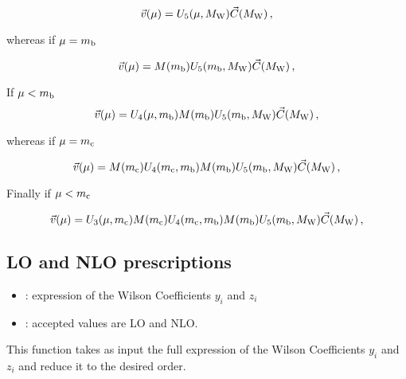 \begin{equation}
\vec{v}(\mu) =
U_5(\mu,M_{\mathrm W}) \vec{C}(M_{\mathrm W}) \, ,
\label{eq:WCv}
\end{equation}

whereas if $\mu=m_{\mathrm b}$

\begin{equation}
\vec{v}(\mu) =
M(m_{\mathrm b}) U_5(m_{\mathrm b},M_{\mathrm W}) \vec{C}(M_{\mathrm W}) \, ,
\label{eq:WCv}
\end{equation}

If $\mu<m_{\mathrm b}$
\begin{equation}
\vec{v}(\mu) =
U_4(\mu,m_{\mathrm b}) M(m_{\mathrm b}) U_5(m_{\mathrm b},M_{\mathrm W}) \vec{C}(M_{\mathrm W}) \, ,
\label{eq:WCv}
\end{equation}

whereas if $\mu=m_{\mathrm c}$

\begin{equation}
\vec{v}(\mu) =
M(m_{\mathrm c}) U_4(m_{\mathrm c},m_{\mathrm b}) M(m_{\mathrm b}) U_5(m_{\mathrm b},M_{\mathrm W}) \vec{C}(M_{\mathrm W}) \, ,
\label{eq:WCv}
\end{equation}

Finally if $\mu<m_{\mathrm c}$

\begin{equation}
\vec{v}(\mu) =
U_3(\mu,m_{\mathrm c}) M(m_{\mathrm c}) U_4(m_{\mathrm c},m_{\mathrm b}) M(m_{\mathrm b}) U_5(m_{\mathrm b},M_{\mathrm W})
\vec{C}(M_{\mathrm W}) \, ,
\label{eq:WCv}
\end{equation}

\subsection{LO and NLO prescriptions}


\begin{itemize}
\item {}: expression of the Wilson Coefficients $y_i$ and $z_i$
\item {}: accepted values are LO and NLO.
\end{itemize}

This function takes as input the full expression of the Wilson Coefficients 
$y_i$ and $z_i$ and reduce it to the desired order.

